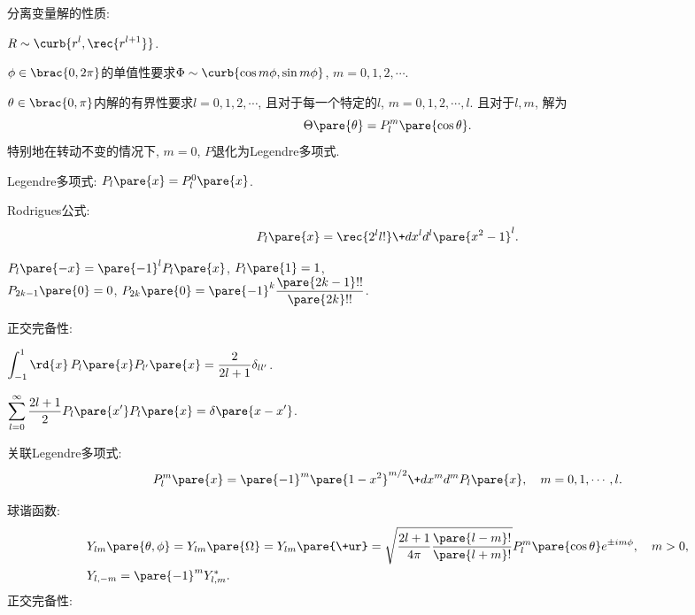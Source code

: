 \documentclass[hidelinks]{ctexart}
\begin{document}
\begin{cenum}
    \item 分离变量解的性质:
    \begin{cenum}
        \item $\displaystyle R \sim \curb{r^l,\rec{r^{l+1}}}$.
        \item $\displaystyle \phi \in \brac{0,2\pi}$的单值性要求$\Phi \sim \curb{\cos m\phi, \sin m\phi}$, $m=0,1,2,\cdots$.
        \item $\theta \in \brac{0,\pi}$内解的有界性要求$l=0,1,2,\cdots$, 且对于每一个特定的$l$, $m = 0,1,2,\cdots, l$. 且对于$l,m$, 解为
        \[ \Theta\pare{\theta} = P_l^m\pare{\cos\theta}. \]
        特别地在转动不变的情况下, $m=0$, $P$退化为Legendre多项式.
    \end{cenum}
    \item Legendre多项式: $P_l\pare{x} = P_l^0\pare{x}$.
    \begin{cenum}
        \item Rodrigues公式:
        \[ P_l\pare{x} = \rec{2^l l!}\+d{x^l}d{^l}\pare{x^2-1}^l. \]
        \item $P_l\pare{-x} = \pare{-1}^l P_l\pare{x}$, $P_l\pare{1} = 1$,\\
        $P_{2k-1}\pare{0} = 0$, $\displaystyle P_{2k}\pare{0} = \pare{-1}^k\frac{\pare{2k-1}!!}{\pare{2k}!!}$.
        \item 正交完备性:
        \begin{cenum}
            \item $\displaystyle \int_{-1}^{1} \rd{x}\, P_l\pare{x}P_{l'}\pare{x} = \frac{2}{2l+1} \delta_{ll'}$.
            \item $\displaystyle \sum_{l=0}^\infty \frac{2l+1}{2}P_l\pare{x'} P_l\pare{x} = \delta\pare{x-x'}$.
        \end{cenum}
    \end{cenum}
    \item 关联Legendre多项式:
    \[ P_l^m\pare{x} = \pare{-1}^m \pare{1-x^2}^{m/2}\+d{x^m}d{^m}P_l\pare{x},\quad m=0,1,\cdots,l. \]
    \item 球谐函数:
    \begin{align*}
        &Y_{lm}\pare{\theta,\phi} = Y_{lm}\pare{\Omega} = Y_{lm}\pare{\+ur} = \sqrt{\frac{2l+1}{4\pi}\frac{\pare{l-m}!}{\pare{l+m}!}}P_l^m\pare{\cos\theta}e^{\pm im\phi},\quad m>0,\\
        &Y_{l,-m} = \pare{-1}^m Y_{l,m}^*.
    \end{align*}
    正交完备性:
    \begin{cenum}

\end{cenum}
\end{cenum}
\end{document}
